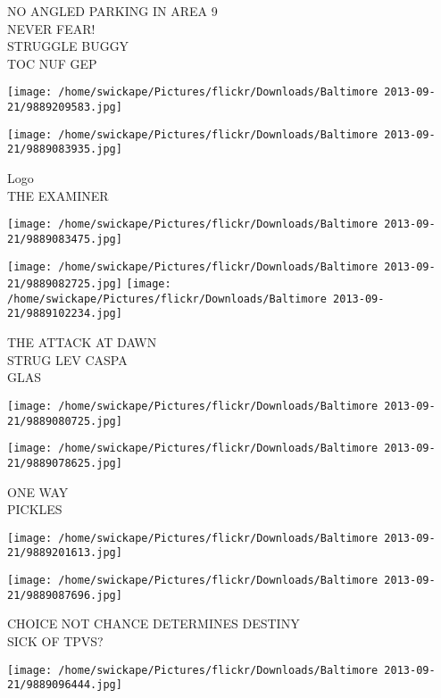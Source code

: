 \documentclass[10pt,letterpaper]{article}
\begin{document}
NO ANGLED PARKING IN AREA 9\\
NEVER FEAR!\\
STRUGGLE BUGGY\\
TOC NUF GEP\\
\pagebreak

\texttt{[image: /home/swickape/Pictures/flickr/Downloads/Baltimore 2013-09-21/9889209583.jpg]}

\vspace{0.25in}
\texttt{[image: /home/swickape/Pictures/flickr/Downloads/Baltimore 2013-09-21/9889083935.jpg]}

Logo\\
THE EXAMINER\\
\pagebreak

\texttt{[image: /home/swickape/Pictures/flickr/Downloads/Baltimore 2013-09-21/9889083475.jpg]}

\vspace{0.25in}
\texttt{[image: /home/swickape/Pictures/flickr/Downloads/Baltimore 2013-09-21/9889082725.jpg]}
\texttt{[image: /home/swickape/Pictures/flickr/Downloads/Baltimore 2013-09-21/9889102234.jpg]}

THE ATTACK AT DAWN\\
STRUG LEV CASPA\\
GLAS\\
\pagebreak

\texttt{[image: /home/swickape/Pictures/flickr/Downloads/Baltimore 2013-09-21/9889080725.jpg]}

\vspace{0.25in}
\texttt{[image: /home/swickape/Pictures/flickr/Downloads/Baltimore 2013-09-21/9889078625.jpg]}

ONE WAY\\
PICKLES\\
\pagebreak

\texttt{[image: /home/swickape/Pictures/flickr/Downloads/Baltimore 2013-09-21/9889201613.jpg]}

\vspace{0.25in}
\texttt{[image: /home/swickape/Pictures/flickr/Downloads/Baltimore 2013-09-21/9889087696.jpg]}

CHOICE NOT CHANCE DETERMINES DESTINY\\
SICK OF TPVS?\\
\pagebreak

\texttt{[image: /home/swickape/Pictures/flickr/Downloads/Baltimore 2013-09-21/9889096444.jpg]}
\end{document}
